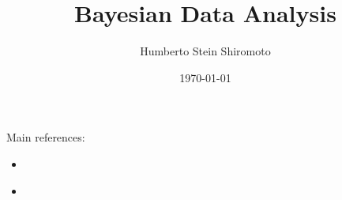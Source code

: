 \documentclass[sfsidenotes,notoc,nobib,a4paper]{tufte-book}
\title{Bayesian Data Analysis}
\author{Humberto Stein Shiromoto}
\date{\today}
\begin{document}
\setcounter{tocdepth}{1}
\maketitle




\tableofcontents
\adjustmtc
\printnomenclature

\newpage
Main references:
\begin{itemize}
    \item \citep{Martin:2018aa}
    \item \citep{Gelman:2013}
\end{itemize}











\appendix
%



\printbibliography[heading=bibintoc]
\printindex
\end{document}
